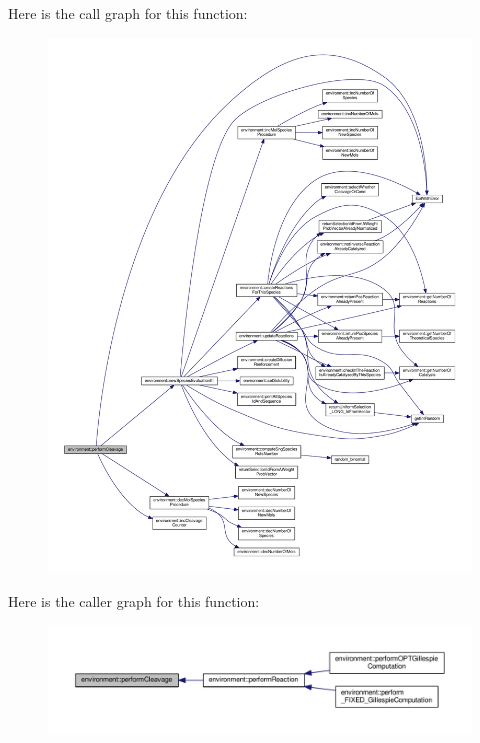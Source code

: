 Here is the call graph for this function\-:\nopagebreak
\begin{figure}[H]
\begin{center}
\leavevmode
\includegraphics[width=350pt]{a00003_aa4ed307a123c402166cfc7f6ed99043a_cgraph}
\end{center}
\end{figure}




Here is the caller graph for this function\-:\nopagebreak
\begin{figure}[H]
\begin{center}
\leavevmode
\includegraphics[width=350pt]{a00003_aa4ed307a123c402166cfc7f6ed99043a_icgraph}
\end{center}
\end{figure}



